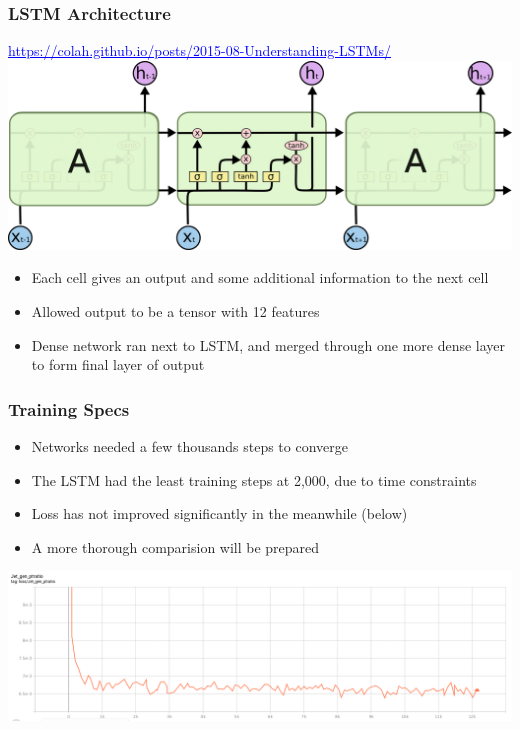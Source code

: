 \documentclass{beamer}
\newcommand{\link}[2]{\href{#2}{\textcolor{blue}{\underline{#1}}}}
\begin{document}
\begin{frame}
  \frametitle{LSTM Architecture}

  \link{https://colah.github.io/posts/2015-08-Understanding-LSTMs/}{https://colah.github.io/posts/2015-08-Understanding-LSTMs/}
  \includegraphics[width=\linewidth]{../../190813/figs/LSTM3-chain.png}

  \begin{itemize}
  \item Each cell gives an output and some additional information to the next cell
  \item Allowed output to be a tensor with 12 features
  \item Dense network ran next to LSTM,
    and merged through one more dense layer
    to form final layer of output
  \end{itemize}

\end{frame}

\begin{frame}
  \frametitle{Training Specs}

  \begin{itemize}
  \item Networks needed a few thousands steps to converge
  \item The LSTM had the least training steps at 2,000, due to time constraints
  \item Loss has not improved significantly in the meanwhile (below)
  \item A more thorough comparision will be prepared
  \end{itemize}

  \includegraphics[width=\linewidth]{../../190813/figs/Screenshot_2019-08-13_TensorBoard.png}


\end{frame}
\end{document}
